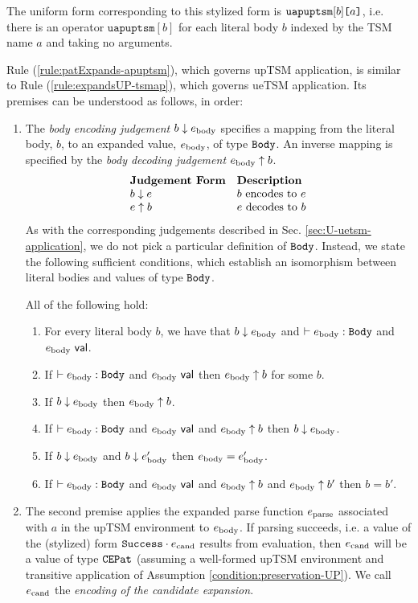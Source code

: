 {{{{The uniform form corresponding to this stylized form is $\texttt{uapuptsm}[b]\texttt{[}a\texttt{]}$, i.e. there is an operator $\texttt{uapuptsm}[b]$ for each literal body $b$ indexed by the TSM name $a$ and taking no arguments.

Rule (\ref{rule:patExpands-apuptsm}), which governs upTSM application, is similar to Rule (\ref{rule:expandsUP-tsmap}), which governs ueTSM application. Its premises can be understood as follows, in order:
\begin{enumerate}
\item The \emph{body encoding judgement} $b \downarrow e_\text{body}$ specifies a mapping from the literal body, $b$, to an expanded value, $e_\text{body}$, of type $\mathtt{Body}$. An inverse mapping is specified by the \emph{body decoding judgement} $e_\text{body} \uparrow b$.
\[\begin{array}{ll}
\textbf{Judgement Form} & \textbf{Description}\\
b \downarrow e & \text{$b$ encodes to $e$}\\
e \uparrow b & \text{$e$ decodes to $b$}
\end{array}\]
As with the corresponding judgements described in Sec. \ref{sec:U-uetsm-application}, we do not pick a particular definition of $\mathtt{Body}$. Instead, we state the following sufficient conditions, which establish an isomorphism between literal bodies and values of type $\mathtt{Body}$.
\begin{condition} All of the following hold:
\begin{enumerate}
\item For every literal body $b$, we have that $b \downarrow e_\text{body}$ and $\vdash e_\text{body} : \mathtt{Body}$ and $e_\text{body}~\mathsf{val}$.
\item If $\vdash e_\text{body} : \mathtt{Body}$ and $e_\text{body}~\mathsf{val}$ then $e_\text{body} \uparrow b$ for some $b$.
\item If $b \downarrow e_\text{body}$ then $e_\text{body} \uparrow b$.
\item If $\vdash e_\text{body} : \mathtt{Body}$ and $e_\text{body}~\mathsf{val}$ and $e_\text{body} \uparrow b$ then $b \downarrow e_\text{body}$. 
\item If $b \downarrow e_\text{body}$ and $b \downarrow e_\text{body}'$ then $e_\text{body} = e_\text{body}'$.
\item If $\vdash e_\text{body} : \mathtt{Body}$ and $e_\text{body}~\mathsf{val}$ and $e_\text{body} \uparrow b$ and $e_\text{body} \uparrow b'$ then $b=b'$.
\end{enumerate}
\end{condition}
\item The second premise applies the expanded parse function $e_\text{parse}$ associated with $a$ in the upTSM environment to $e_\text{body}$. If parsing succeeds, i.e. a value of the (stylized) form $\mathtt{Success} \cdot e_\text{cand}$ results from evaluation, then $e_\text{cand}$ will be a value of type $\mathtt{CEPat}$ (assuming a well-formed upTSM environment and transitive application of Assumption \ref{condition:preservation-UP}). We call $e_\text{cand}$ the \emph{encoding of the candidate expansion}.


\end{enumerate}}}}}
